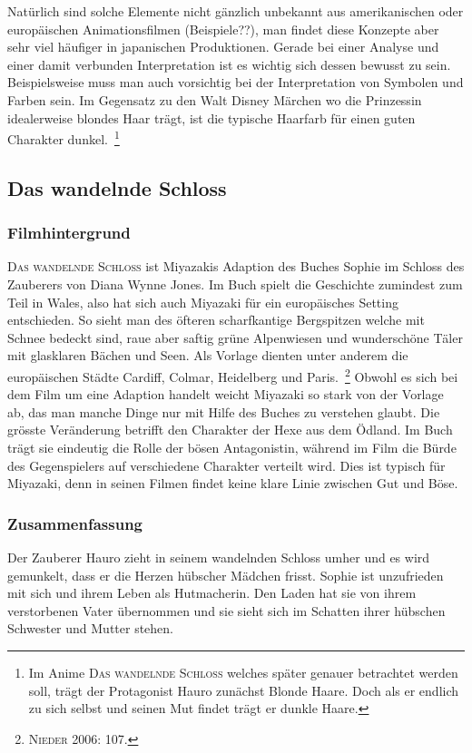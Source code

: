 Natürlich sind solche Elemente nicht gänzlich unbekannt aus amerikanischen oder europäischen Animationsfilmen (Beispiele??), man findet diese Konzepte aber sehr viel häufiger in japanischen Produktionen. Gerade bei einer Analyse und einer damit verbunden Interpretation ist es wichtig sich dessen bewusst zu sein. Beispielsweise muss man auch vorsichtig bei der Interpretation von Symbolen und Farben sein. Im Gegensatz zu den Walt Disney Märchen wo die Prinzessin idealerweise blondes Haar trägt, ist die typische Haarfarb für einen guten Charakter dunkel.~\footnote{Im Anime \textsc{Das wandelnde Schloss} welches später genauer betrachtet werden soll, trägt der Protagonist Hauro zunächst Blonde Haare. Doch als er endlich zu sich selbst und seinen Mut findet trägt er dunkle Haare.} 

\subsection{Das wandelnde Schloss}

\subsubsection{Filmhintergrund}
\textsc{Das wandelnde Schloss} ist Miyazakis Adaption des Buches \glqq Sophie im Schloss des Zauberers \grqq von Diana Wynne Jones. Im Buch spielt die Geschichte zumindest zum Teil in Wales, also hat sich auch Miyazaki für ein europäisches Setting entschieden. So sieht man des öfteren scharfkantige Bergspitzen welche mit Schnee bedeckt sind, raue aber saftig grüne Alpenwiesen und wunderschöne Täler mit glasklaren Bächen und Seen. Als Vorlage dienten unter anderem die europäischen Städte Cardiff, Colmar, Heidelberg und Paris.~\footnote{\textsc{Nieder} 2006: 107.} Obwohl es sich bei dem Film um eine Adaption handelt weicht Miyazaki so stark von der Vorlage ab, das man manche Dinge nur mit Hilfe des Buches zu verstehen glaubt. Die grösste Veränderung betrifft den Charakter der Hexe aus dem Ödland. Im Buch trägt sie eindeutig die Rolle der bösen Antagonistin, während im Film die Bürde des Gegenspielers auf verschiedene Charakter verteilt wird. Dies ist typisch für Miyazaki, denn in seinen Filmen findet keine klare Linie zwischen Gut und Böse. 

\subsubsection{Zusammenfassung}
Der Zauberer Hauro zieht in seinem wandelnden Schloss umher und es wird gemunkelt, dass er die Herzen hübscher Mädchen frisst. Sophie ist unzufrieden mit sich und ihrem Leben als Hutmacherin. Den Laden hat sie von ihrem verstorbenen Vater übernommen und sie sieht sich im Schatten ihrer hübschen Schwester und Mutter stehen. 

